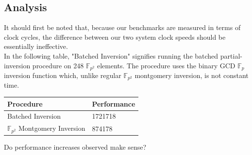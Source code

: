 \subsection{Analysis}
It should first be noted that, because our benchmarks are measured in terms of clock cycles, the difference between our two system clock speeds should be essentially ineffective. \\

In the following table, "Batched Inversion" signifies running the batched partial-inversion procedure on 248 $\mathbb{F}_{p^{2}}$ elements. The procedure uses the binary GCD $\mathbb{F}_{p}$ inversion function which, unlike regular $\mathbb{F}_{p^{2}}$ montgomery inversion, is not constant time.\\

\begin{center}
\begin{tabular}{@{}ll@{}}
	\toprule
	Procedure & Performance \\
	\midrule
	Batched Inversion & 1721718\\
	$\mathbb{F}_{p^{2}}$ Montgomery Inversion & 874178\\
	\bottomrule
\end{tabular}
\end{center}

Do performance increases observed make sense?\\

